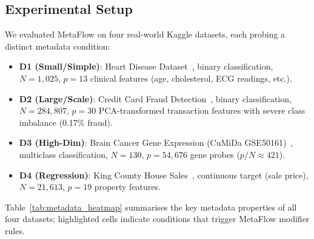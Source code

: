 \documentclass[conference]{llncs}
\begin{document}
   \subsection{Experimental Setup}
   We evaluated MetaFlow on four real-world Kaggle datasets, each probing a distinct metadata condition:
   \begin{itemize}
       \item \textbf{D1 (Small/Simple)}: Heart Disease Dataset~\cite{janosi1988heart}, binary classification, $N=1{,}025$, $p=13$ clinical features (age, cholesterol, ECG readings, etc.).
       \item \textbf{D2 (Large/Scale)}: Credit Card Fraud Detection~\cite{dalpozzolo2015fraud}, binary classification, $N=284{,}807$, $p=30$ PCA-transformed transaction features with severe class imbalance (0.17\% fraud).
       \item \textbf{D3 (High-Dim)}: Brain Cancer Gene Expression (CuMiDa GSE50161)~\cite{feltes2019cumida}, multiclass classification, $N=130$, $p=54{,}676$ gene probes ($p/N \approx 421$).
       \item \textbf{D4 (Regression)}: King County House Sales~\cite{harlfoxem2016kc}, continuous target (sale price), $N=21{,}613$, $p=19$ property features.
   \end{itemize}

   Table~\ref{tab:metadata_heatmap} summarises the key metadata properties of all four datasets; highlighted cells indicate conditions that trigger MetaFlow modifier rules.
\end{document}
